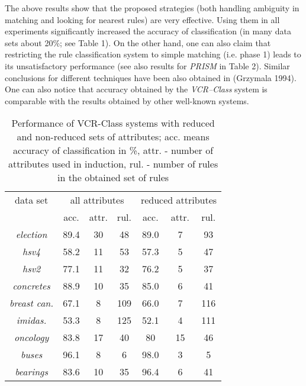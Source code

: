 The  above  results  show  that  the  proposed   strategies     (both
handling ambiguity in  matching  and  looking  for   nearest   rules)
are  very effective. Using them in  all   experiments   significantly
increased  the accuracy of classification (in many data  sets   about
20\%;  see Table 1). On the other hand,   one can also claim that
restricting   the   rule classification system to   simple   matching
(i.e. phase  1)  leads  to   its  unsatisfactory   performance   (see
also results for  {\it PRISM} in Table 2). Similar conclusions  for
different  techniques   have    been   also obtained in (Grzymala
1994). One    can  also   notice   that
accuracy obtained by the {\it  VCR--Class}   system   is   comparable
with the results obtained  by  other  well-known  systems.

\begin{table}
\begin{center}
{\footnotesize
\caption{Performance of VCR-Class systems with reduced and
non-reduced  sets  of  attributes;   acc.   means   accuracy   of
classification in \%, attr. -  number  of  attributes  used  in
induction, rul. - number of rules in the obtained set of rules}
\vspace{5pt}
\begin{tabular}{|c|c|c|c|c|c|c|}
\hline
data set & \multicolumn{3}{|c|}{all attributes} &
\multicolumn{3}{|c|}{reduced attributes} \\ \cline{2-7}
 & acc. & attr. & rul. & acc. & attr. & rul.\\ \hline
{\it election} & 89.4 & 30 & 48 & 89.0 & 7 & 93 \\ \hline
{\it hsv4} & 58.2 & 11 & 53 & 57.3 & 5 & 47 \\ \hline
{\it hsv2} & 77.1 & 11 & 32 & 76.2 & 5 & 37 \\ \hline
{\it concretes} & 88.9 & 10 & 35 & 85.0 & 6 & 41 \\ \hline
{\it breast can.} & 67.1 & 8 & 109 & 66.0 & 7 & 116 \\ \hline
{\it imidas.} & 53.3 & 8 & 125 & 52.1 & 4 & 111 \\ \hline
{\it oncology} & 83.8 & 17 & 40 & 80 & 15 & 46 \\ \hline
{\it buses} & 96.1 & 8 & 6 & 98.0 & 3 & 5 \\ \hline
{\it bearings} & 83.6 & 10 & 35 & 96.4 & 6 & 41 \\ \hline
\end{tabular}
}
\end{center}
\end{table}


